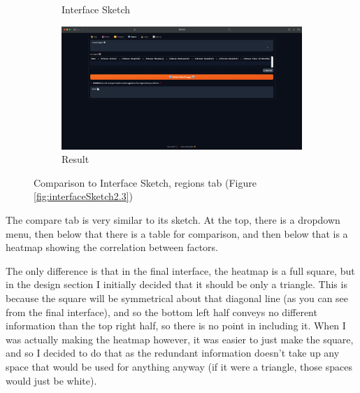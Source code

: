 \documentclass[12pt]{report}
\begin{document}
\begin{figure}[H]
\begin{subfigure}{\textwidth}
{}
    \caption{Interface Sketch}
\end{subfigure}
\begin{subfigure}{.82\textwidth}
    \centering
    \includegraphics[width=\linewidth]{finalUIregions.png}
    \caption{Result}
\end{subfigure}
\caption{Comparison to Interface Sketch, regions tab (Figure \ref{fig:interfaceSketch2.3})}\label{fig:compareSketch3}
\end{figure}

The compare tab is very similar to its sketch. At the top, there is a dropdown menu, then below that there is a table for comparison, and then below that is a heatmap showing the correlation between factors.

The only difference is that in the final interface, the heatmap is a full square, but in the design section I initially decided that it should be only a triangle. This is because the square will be symmetrical about that diagonal line (as you can see from the final interface), and so the bottom left half conveys no different information than the top right half, so there is no point in including it. When I was actually making the heatmap however, it was easier to just make the square, and so I decided to do that as the redundant information doesn't take up any space that would be used for anything anyway (if it were a triangle, those spaces would just be white).
\end{document}
